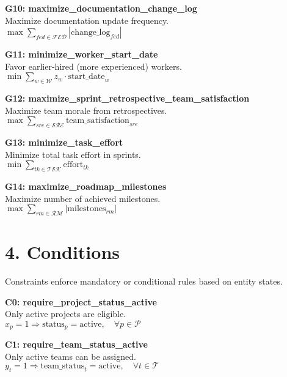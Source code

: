 \documentclass[12pt]{article}
\begin{document}
    \item \textbf{G10: maximize\_documentation\_change\_log} \\
    Maximize documentation update frequency. \\
    $ \max \sum_{fed \in \mathcal{FED}} |\text{change\_log}_{fed}| $

    \item \textbf{G11: minimize\_worker\_start\_date} \\
    Favor earlier-hired (more experienced) workers. \\
    $ \min \sum_{w \in \mathcal{W}} z_w \cdot \text{start\_date}_w $

    \item \textbf{G12: maximize\_sprint\_retrospective\_team\_satisfaction} \\
    Maximize team morale from retrospectives. \\
    $ \max \sum_{sre \in \mathcal{SRE}} \text{team\_satisfaction}_{sre} $

    \item \textbf{G13: minimize\_task\_effort} \\
    Minimize total task effort in sprints. \\
    $ \min \sum_{tk \in \mathcal{TSK}} \text{effort}_{tk} $

    \item \textbf{G14: maximize\_roadmap\_milestones} \\
    Maximize number of achieved milestones. \\
    $ \max \sum_{rm \in \mathcal{RM}} |\text{milestones}_{rm}| $

\section{4. Conditions}

Constraints enforce mandatory or conditional rules based on entity states.

\item \textbf{C0: require\_project\_status\_active} \\
    Only active projects are eligible. \\
    $ x_p = 1 \Rightarrow \text{status}_p = \text{active}, \quad \forall p \in \mathcal{P} $

    \item \textbf{C1: require\_team\_status\_active} \\
    Only active teams can be assigned. \\
    $ y_t = 1 \Rightarrow \text{team\_status}_t = \text{active}, \quad \forall t \in \mathcal{T} $
\end{document}
